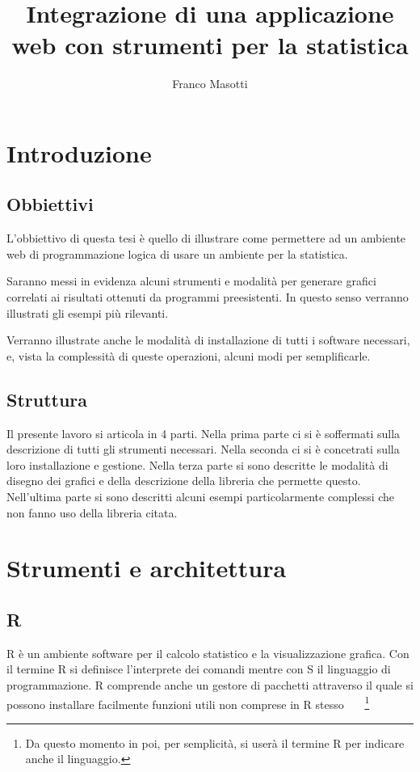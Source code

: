 \documentclass[10pt,titlepage,twoside,a4paper]{report}
\title{Integrazione di una applicazione web con strumenti per la statistica}
\author{Franco Masotti}
\begin{document}

\maketitle
\newpage
\tableofcontents
\newpage
\listoffigures
\newpage
\listoflistings
\cleardoublepage





\chapter{Introduzione}
\label{ch:introduzione}
    \section{Obbiettivi}
L'obbiettivo di questa tesi è quello di illustrare come 
permettere ad un ambiente web di programmazione logica di usare un ambiente per 
la statistica.

Saranno messi in evidenza alcuni strumenti e modalità per generare grafici 
correlati ai risultati ottenuti da programmi preesistenti. In questo senso 
verranno illustrati gli esempi più rilevanti.

Verranno illustrate anche le modalità di installazione di tutti i software
necessari, e, vista la complessità di queste operazioni, alcuni modi per 
semplificarle.

    \section{Struttura}
Il presente lavoro si articola in 4 parti. Nella prima parte ci si è 
soffermati sulla descrizione di tutti gli strumenti necessari. Nella seconda ci 
si è concetrati sulla loro installazione e gestione. Nella terza parte si sono 
descritte le modalità di disegno dei grafici e della descrizione della 
libreria che permette questo. Nell'ultima parte si sono descritti alcuni esempi 
particolarmente complessi che non fanno uso della libreria citata.




\chapter{Strumenti e architettura}

    \section{R}
R è un ambiente software per il calcolo statistico e la 
visualizzazione grafica. Con il termine R si definisce 
l'interprete dei comandi mentre con S il linguaggio di programmazione. R 
comprende anche un gestore di pacchetti attraverso il quale si possono 
installare facilmente funzioni utili non comprese in R 
stesso~\cite{r}~\cite{rDefinition} ~\footnote{Da questo momento in poi, per 
semplicità, 
si userà il termine R per indicare anche il linguaggio.}
\end{document}
